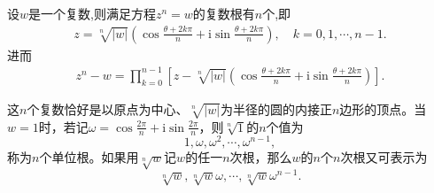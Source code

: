 \documentclass[../../main.tex]{subfiles}%
\begin{document}
\begin{proposition}\label{proposition:n次复根}
设$w$是一个复数,则满足方程$z^n=w$的复数根有$n$个,即
\begin{align*}
z = \sqrt[n]{|w|}\left( \cos\frac{\theta + 2k\pi}{n} + \mathrm{i}\sin\frac{\theta + 2k\pi}{n} \right),\quad k = 0, 1, \cdots, n - 1.
\end{align*}
进而
\begin{align*}
z^n-w = \prod_{k=0}^{n-1}{\left[ z-\sqrt[n]{|w|}\left( \cos \frac{\theta +2k\pi}{n}+\mathrm{i}\sin \frac{\theta +2k\pi}{n} \right) \right]}.
\end{align*}
\end{proposition}
\begin{remark}
这\(n\)个复数恰好是以原点为中心、\(\sqrt[n]{|w|}\)为半径的圆的内接正\(n\)边形的顶点。当\(w = 1\)时，若记\(\omega = \cos\frac{2\pi}{n} + \mathrm{i}\sin\frac{2\pi}{n}\)，则\(\sqrt[n]{1}\)的\(n\)个值为
\[
1, \omega, \omega^2, \cdots, \omega^{n - 1},
\]
称为\(n\)个单位根。如果用\(\sqrt[n]{w}\)记\(w\)的任一\(n\)次根，那么\(w\)的\(n\)个\(n\)次根又可表示为
\[
\sqrt[n]{w}, \sqrt[n]{w}\omega, \cdots, \sqrt[n]{w}\omega^{n - 1}.
\]
\end{remark}
\end{document}
